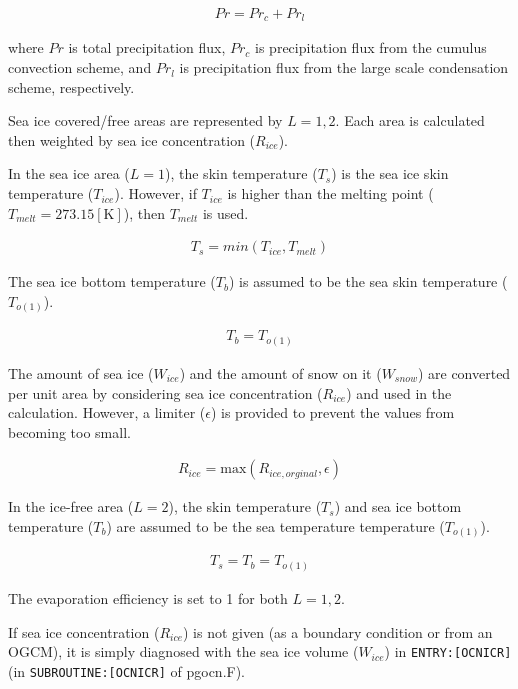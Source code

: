 \begin{eqnarray}
    Pr = Pr_c + Pr_l
\end{eqnarray}

where \(Pr\) is total precipitation flux, \(Pr_c\) is precipitation flux from the cumulus convection scheme, and \(Pr_l\) is precipitation flux from the large scale condensation scheme, respectively.

Sea ice covered/free areas are represented by \(L=1,2\). Each area is calculated then weighted by sea ice concentration (\(R_{ice}\)).

In the sea ice area (\(L=1\)), the skin temperature (\(T_s\)) is the sea ice skin temperature (\(T_{ice}\)). However, if \(T_{ice}\) is higher than the melting point
(\(T_{melt}=273.15 \mathrm{[K]}\)), then \(T_{melt}\) is used.

\begin{eqnarray}
    T_s = min(T_{ice},T_{melt})
\end{eqnarray}

The sea ice bottom temperature (\(T_b\)) is assumed to be the sea skin temperature (\(T_{o(1)}\)).

\begin{eqnarray}
    T_b = T_{o(1)}
\end{eqnarray}

The amount of sea ice (\(W_{ice}\)) and the amount of snow on it (\(W_{snow}\)) are converted per unit area by considering sea ice concentration (\(R_{ice}\)) and used in the calculation. However, a
limiter (\(\epsilon\)) is provided to prevent the values from becoming too small.

\begin{eqnarray}
R_{ice} =\mathrm{max}( R_{ice,orginal}, \epsilon)
\end{eqnarray}

In the ice-free area (\(L=2\)), the skin temperature (\(T_s\)) and sea ice bottom temperature (\(T_b\)) are assumed to be the sea temperature temperature (\(T_{o(1)}\)).

\begin{eqnarray}
    T_s = T_b = T_{o(1)}
\end{eqnarray}

The evaporation efficiency is set to 1 for both \(L=1, 2\).

If sea ice concentration (\(R_{ice}\)) is not given (as a boundary condition or from an OGCM), it is simply diagnosed with the sea ice volume (\(W_{ice}\)) in \texttt{ENTRY:{[}OCNICR{]}} (in
\texttt{SUBROUTINE:{[}OCNICR{]}} of pgocn.F).

